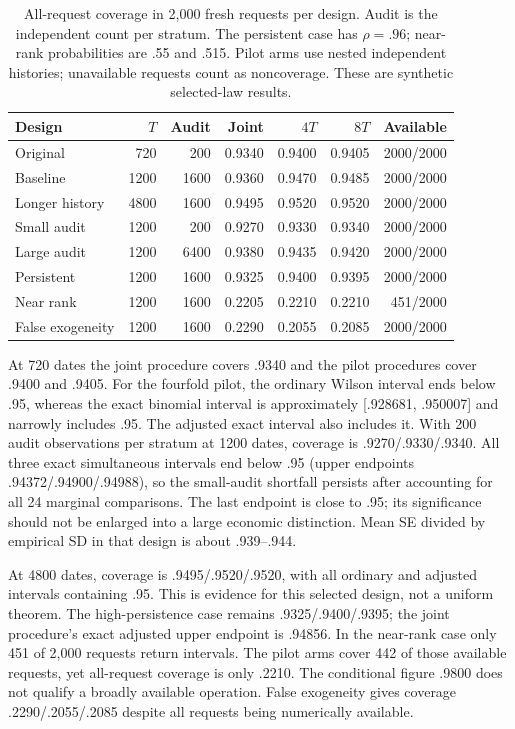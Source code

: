 \begin{table}[htbp]
\centering\small
\begin{tabular}{lrrrrrr}
\toprule
Design & $T$ & Audit & Joint & $4T$ & $8T$ & Available\\
\midrule
Original & 720 & 200 & 0.9340 & 0.9400 & 0.9405 & 2000/2000\\
Baseline & 1200 & 1600 & 0.9360 & 0.9470 & 0.9485 & 2000/2000\\
Longer history & 4800 & 1600 & 0.9495 & 0.9520 & 0.9520 & 2000/2000\\
Small audit & 1200 & 200 & 0.9270 & 0.9330 & 0.9340 & 2000/2000\\
Large audit & 1200 & 6400 & 0.9380 & 0.9435 & 0.9420 & 2000/2000\\
Persistent & 1200 & 1600 & 0.9325 & 0.9400 & 0.9395 & 2000/2000\\
Near rank & 1200 & 1600 & 0.2205 & 0.2210 & 0.2210 & 451/2000\\
False exogeneity & 1200 & 1600 & 0.2290 & 0.2055 & 0.2085 & 2000/2000\\
\bottomrule
\end{tabular}
\caption{All-request coverage in 2,000 fresh requests per design. Audit is the independent count per stratum. The persistent case has $\rho=.96$; near-rank probabilities are .55 and .515. Pilot arms use nested independent histories; unavailable requests count as noncoverage. These are synthetic selected-law results.}
\label{tab:v10:coverage}
\end{table}
At 720 dates the joint procedure covers .9340 and the pilot procedures
cover .9400 and .9405. For the fourfold pilot, the ordinary Wilson interval
ends below .95, whereas the exact binomial interval is approximately
[.928681, .950007] and narrowly includes .95. The adjusted exact interval
also includes it. With 200 audit
observations per stratum at 1200 dates, coverage is .9270/.9330/.9340. All
three exact simultaneous intervals end below .95 (upper endpoints
.94372/.94900/.94988), so the small-audit shortfall persists after accounting
for all 24 marginal comparisons. The last endpoint is close to .95; its
significance should not be enlarged into a large economic distinction.
Mean SE divided by empirical SD in that design is about .939--.944.

At 4800 dates, coverage is .9495/.9520/.9520, with all ordinary and adjusted
intervals containing .95. This is evidence for this selected design, not a
uniform theorem. The high-persistence case remains .9325/.9400/.9395; the
joint procedure's exact adjusted upper endpoint is .94856. In the near-rank
case only 451 of 2,000 requests return intervals. The pilot arms cover 442
of those available requests, yet all-request coverage is only .2210. The
conditional figure .9800 does not qualify a broadly available operation.
False exogeneity gives coverage .2290/.2055/.2085 despite all requests being
numerically available.

